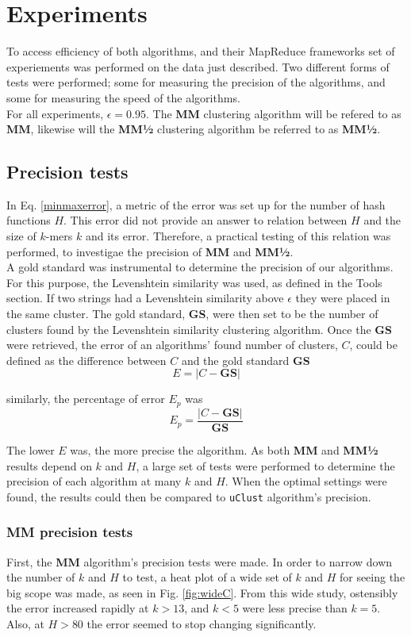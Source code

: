 \documentclass[../../main.tex]{subfiles}
\begin{document}
\section{Experiments}

To access efficiency of both algorithms, and their MapReduce frameworks set of experiements was performed on the data just described. Two different forms of tests were performed; some for measuring the precision of the algorithms, and some for measuring the speed of the algorithms.\\

For all experiments, $\epsilon=0.95$. The {\bf MM} clustering algorithm will be refered to as {\bf MM}, likewise will the {\bf MM½} clustering algorithm be referred to as {\bf MM½}. 
\subsection{Precision tests}

In Eq. \ref{minmaxerror}, a metric of the error was set up for the number of hash functions $H$. This error did not provide an answer to relation between $H$ and the size of $k$-mers $k$ and its error. Therefore, a practical testing of this relation was performed, to investigae the precision of {\bf MM} and {\bf MM½}.\\

A gold standard was instrumental to determine the precision of our algorithms. For this purpose, the Levenshtein similarity was used, as defined in the Tools section. If two strings had a Levenshtein similarity above $\epsilon$ they were placed in the same cluster. The gold standard, \textbf{GS}, were then set to be the number of clusters found by the Levenshtein similarity clustering algorithm. Once the \textbf{GS} were retrieved, the error of an algorithms' found number of clusters, $C$, could be defined as the difference between $C$ and the gold standard \textbf{GS}
$$
E = | C - \mathbf{GS}|
$$

similarly, the percentage of error $E_p$ was 
$$
E_p = \frac{|C - \mathbf{GS}|}{\mathbf{GS}}
$$

The lower $E$ was, the more precise the algorithm. As both {\bf MM} and {\bf MM½} results depend on $k$ and $H$, a large set of tests were performed to determine the precision of each algorithm at many $k$ and $H$. When the optimal settings were found, the results could then be compared to \texttt{uClust} algorithm's precision. 
\subsubsection{MM precision tests}
First, the {\bf MM} algorithm's precision tests were made. In order to narrow down the number of $k$ and $H$ to test, a heat plot of a wide set of $k$ and $H$ for seeing the big scope was made, as seen in Fig. \ref{fig:wideC}. From this wide study, ostensibly the error increased rapidly at $k>13$, and $k<5$ were less precise than $k=5$. Also, at $H>80$ the error seemed to stop changing significantly.
\end{document}
